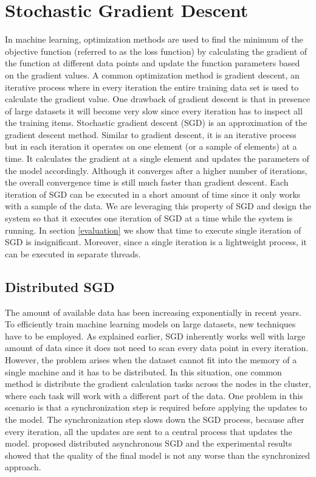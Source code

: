 \documentclass{sig-alternate-05-2015}
\begin{document}
\section{Stochastic Gradient Descent} \label{sgd}
In machine learning, optimization methods are used to find the minimum of the objective function (referred to as the loss function) by calculating the gradient of the function at different data points and update the function parameters based on the gradient values.
A common optimization method is gradient descent, an iterative process where in every iteration the entire training data set is used to calculate the gradient value.
One drawback of gradient descent is that in presence of large datasets it will become very slow since every iteration has to inspect all the training items.
Stochastic gradient descent (SGD) is an approximation of the gradient descent method. 
Similar to gradient descent, it is an iterative process but in each iteration it operates on one element (or a sample of elements) at a time. 
It calculates the gradient at a single element and updates the parameters of the model accordingly. 
Although it converges after a higher number of iterations, the overall convergence time is still much faster than gradient descent. 
Each iteration of SGD can be executed in a short amount of time since it only works with a sample of the data.
We are leveraging this property of SGD and design the system so that it executes one iteration of SGD at a time while the system is running.
In section \ref{evaluation} we show that time to execute single iteration of SGD is insignificant.
Moreover, since a single iteration is a lightweight process, it can be executed in separate threads.

\subsection{Distributed SGD}
The amount of available data has been increasing exponentially in recent years.
To efficiently train machine learning models on large datasets, new techniques have to be employed.
As explained earlier, SGD inherently works well with large amount of data since it does not need to scan every data point in every iteration.
However, the problem arises when the dataset cannot fit into the memory of a single machine and it has to be distributed.
In this situation, one common method is distribute the gradient calculation tasks across the nodes in the cluster, where each task will work with a different part of the data.
One problem in this scenario is that a synchronization step is required before applying the updates to the model. 
The synchronization step slows down the SGD process, because after every iteration, all the updates are sent to a central process that updates the model.
\cite{recht2011hogwild, dean2012large} proposed distributed asynchronous SGD and the experimental results showed that the quality of the final model is not any worse than the synchronized approach. 
\end{document}
